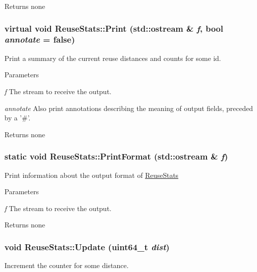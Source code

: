 \begin{DoxyReturn}{Returns}
none 
\end{DoxyReturn}
\hypertarget{class_reuse_stats_a6df6fca111e9ba009af2e3a37824d854}{
\subsubsection[{Print}]{\setlength{\rightskip}{0pt plus 5cm}virtual void ReuseStats::Print (std::ostream \& {\em f}, \/  bool {\em annotate} = {\ttfamily false})}}
\label{class_reuse_stats_a6df6fca111e9ba009af2e3a37824d854}
Print a summary of the current reuse distances and counts for some id.


\begin{DoxyParams}{Parameters}
\item[{\em f}]The stream to receive the output. \item[{\em annotate}]Also print annotations describing the meaning of output fields, preceded by a '\#'.\end{DoxyParams}
\begin{DoxyReturn}{Returns}
none 
\end{DoxyReturn}
\hypertarget{class_reuse_stats_aca96e50e202d9de9d35d5637ce542a3c}{
\subsubsection[{PrintFormat}]{\setlength{\rightskip}{0pt plus 5cm}static void ReuseStats::PrintFormat (std::ostream \& {\em f})}}
\label{class_reuse_stats_aca96e50e202d9de9d35d5637ce542a3c}
Print information about the output format of \hyperlink{class_reuse_stats}{ReuseStats}


\begin{DoxyParams}{Parameters}
\item[{\em f}]The stream to receive the output.\end{DoxyParams}
\begin{DoxyReturn}{Returns}
none 
\end{DoxyReturn}
\hypertarget{class_reuse_stats_a5383136c63ed260d9aad44a8d048a2ed}{
\subsubsection[{Update}]{\setlength{\rightskip}{0pt plus 5cm}void ReuseStats::Update (uint64\_\-t {\em dist})}}
\label{class_reuse_stats_a5383136c63ed260d9aad44a8d048a2ed}
Increment the counter for some distance.


